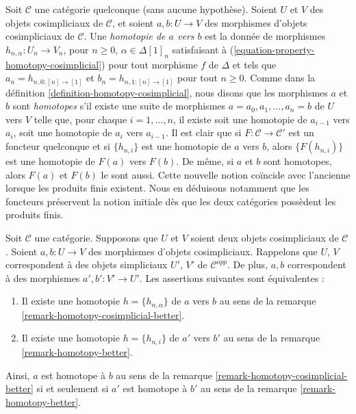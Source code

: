 \begin{remark}
\label{remark-homotopy-cosimplicial-better}
Soit $\mathcal{C}$ une catégorie quelconque (sans aucune hypothèse).
Soient $U$ et $V$ des objets cosimpliciaux de $\mathcal{C}$, et soient
$a, b : U \to V$ des morphismes d'objets cosimpliciaux de $\mathcal{C}$.
Une {\it homotopie de $a$ vers $b$} est la donnée de morphismes
$h_{n, \alpha} : U_n \to V_n$, pour $n \geq 0$, $\alpha \in \Delta[1]_n$
satisfaisant à (\ref{equation-property-homotopy-cosimplicial})
pour tout morphisme $f$ de $\Delta$ et tels que
$a_n = h_{n, 0 : [n] \to [1]}$ et $b_n = h_{n, 1 : [n] \to [1]}$
pour tout $n \geq 0$.
Comme dans la définition \ref{definition-homotopy-cosimplicial},
nous disons que les morphismes $a$ et $b$ sont {\it homotopes} s'il existe
une suite de morphismes $a = a_0, a_1, \ldots, a_n = b$ de $U$ vers $V$
telle que, pour chaque $i = 1, \ldots, n$, il existe soit une homotopie de
$a_{i - 1}$ vers $a_i$, soit une homotopie de $a_i$ vers $a_{i - 1}$.
Il est clair que si $F : \mathcal{C} \to \mathcal{C}'$ est un foncteur
quelconque et si $\{h_{n, i}\}$ est une homotopie de $a$ vers $b$, alors
$\{F(h_{n, i})\}$ est une homotopie de $F(a)$ vers $F(b)$.
De même, si $a$ et $b$ sont homotopes, alors $F(a)$ et $F(b)$ le sont aussi.
Cette nouvelle notion coïncide avec l'ancienne lorsque les produits finis
existent. Nous en déduisons notamment que les foncteurs préservent la notion
initiale dès que les deux catégories possèdent les produits finis.
\end{remark}

\begin{lemma}
\label{lemma-compare-homotopies}
Soit $\mathcal{C}$ une catégorie. Supposons que $U$ et $V$ soient deux
objets cosimpliciaux de $\mathcal{C}$. Soient $a, b : U \to V$ des morphismes
d'objets cosimpliciaux. Rappelons que $U$, $V$ correspondent à des objets
simpliciaux $U'$, $V'$ de $\mathcal{C}^{opp}$.
De plus, $a, b$ correspondent à des morphismes $a', b' : V' \to U'$.
Les assertions suivantes sont équivalentes :
\begin{enumerate}
\item Il existe une homotopie $h = \{h_{n, \alpha}\}$ de
$a$ vers $b$ au sens de la remarque \ref{remark-homotopy-cosimplicial-better}.
\item Il existe une homotopie $h = \{h_{n, i}\}$ de $a'$ vers $b'$
au sens de la remarque \ref{remark-homotopy-better}.
\end{enumerate}
Ainsi, $a$ est homotope à $b$ au sens de la
remarque \ref{remark-homotopy-cosimplicial-better} si et seulement si
$a'$ est homotope à $b'$ au sens de la
remarque \ref{remark-homotopy-better}.
\end{lemma}

